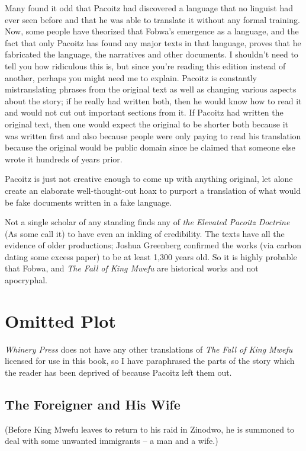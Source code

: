 Many found it odd that Pacoitz had discovered a language that no linguist had ever seen before and that he was able to translate it without any formal training. Now, some people have theorized that Fobwa's emergence as a language, and the fact that only Pacoitz has found any major texts in that language, proves that he fabricated the language, the narratives and other documents. I shouldn't need to tell you how ridiculous this is, but since you're reading this edition instead of another, perhaps you might need me to explain. Pacoitz is constantly mistranslating phrases from the original text as well as changing various aspects about the story; if he really had written both, then he would know how to read it and would not cut out important sections from it. If Pacoitz had written the original text, then one would expect the original to be shorter both because it was written first and also because people were only paying to read his translation because the original would be public domain since he claimed that someone else wrote it hundreds of years prior.

Pacoitz is just not creative enough to come up with anything original, let alone create an elaborate well-thought-out hoax to purport a translation of what would be fake documents written in a fake language.

Not a single scholar of any standing finds any of \emph{the Elevated Pacoitz Doctrine} (As some call it) to have even an inkling of credibility. The texts have all the evidence of older productions; Joshua Greenberg confirmed the works (via carbon dating some excess paper) to be at least 1,300 years old. So it is highly probable that Fobwa, and \emph{The Fall of King Mwefu} are historical works and not apocryphal.

\chapter{Omitted Plot}
\emph{Whinery Press} does not have any other translations of \emph{The Fall of King Mwefu} licensed for use in this book, so I have paraphrased the parts of the story which the reader has been deprived of because Pacoitz left them out.

\section{The Foreigner and His Wife}
\label{foreigner1}

(Before King Mwefu leaves to return to his raid in Zinodwo, he is summoned to deal with some unwanted immigrants -- a man and a wife.)

